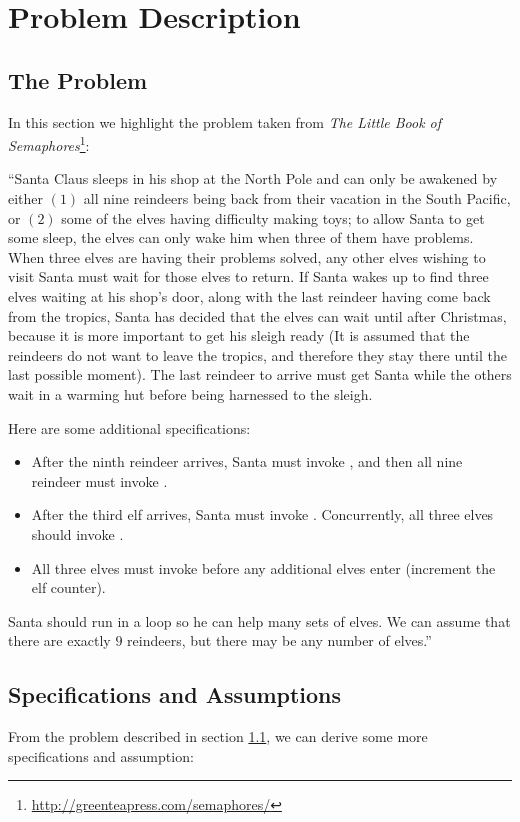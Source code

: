 \section{Problem Description}
\label{sec:problem}

\subsection{The Problem}
\label{subsec:problem}
In this section we highlight the problem taken from
\textit{The Little Book of Semaphores}\footnote{\url{http://greenteapress.com/semaphores/}}:

``Santa Claus sleeps in his shop at the North Pole and can only be awakened by
either $(1)$ all nine reindeers being back from their vacation in the South
Pacific, or $(2)$ some of the elves having difficulty making toys; to allow Santa
to get some sleep, the elves can only wake him when three of them have
problems. When three elves are having their problems solved, any other elves
wishing to visit Santa must wait for those elves to return. If Santa wakes up
to find three elves waiting at his shop’s door, along with the last reindeer
having come back from the tropics, Santa has decided that the elves can wait
until after Christmas, because it is more important to get his sleigh ready
(It is assumed that the reindeers do not want to leave the tropics, and
therefore they stay there until the last possible moment). The last reindeer
to arrive must get Santa while the others wait in a warming hut before being
harnessed to the sleigh.

Here are some additional specifications:

\begin{itemize}
\item After the ninth reindeer arrives, Santa must invoke , and
then all nine reindeer must invoke .
\item After the third elf arrives, Santa must invoke . Concurrently,
all three elves should invoke .
\item All three elves must invoke  before any additional elves enter
(increment the elf counter).
\end{itemize}

Santa should run in a loop so he can help many sets of elves. We can assume
that there are exactly $9$ reindeers, but there may be any number of elves.''

\subsection{Specifications and Assumptions}
\label{subsec:specifications}
From the problem described in section \ref{subsec:problem}, we can derive some
more specifications and assumption:

